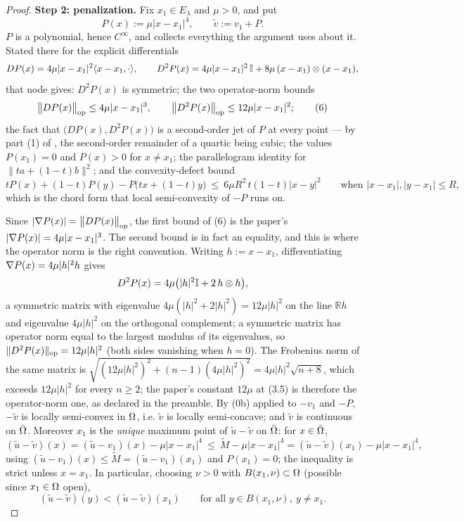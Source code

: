\begin{proof}
\medskip\noindent\textbf{Step 2: penalization.} Fix $x_1\in E_\lambda$ and $\mu>0$, and
put
\[
 P(x):=\mu|x-x_1|^{4},\qquad \tilde v:=v_1+P .
\]
$P$ is a polynomial, hence $C^{\infty}$, and  collects
everything the argument uses about it. Stated there for the explicit differentials
\[
 DP(x)=4\mu|x-x_1|^{2}\langle x-x_1,\cdot\rangle,\qquad
 D^{2}P(x)=4\mu|x-x_1|^{2}\,\mathbb{I}+8\mu\,(x-x_1)\otimes(x-x_1),
\]
that node gives: $D^{2}P(x)$ is symmetric; the two operator-norm bounds
\[
 \big\|DP(x)\big\|_{\rm op}\le4\mu|x-x_1|^{3},\qquad
 \big\|D^{2}P(x)\big\|_{\rm op}\le12\mu|x-x_1|^{2} ; \tag{6}
\]
the fact that $\big(DP(x),D^{2}P(x)\big)$ is a second-order jet of $P$ at every point ---
by part (1) of , the second-order remainder of a quartic
being cubic; the values $P(x_1)=0$ and $P(x)>0$ for $x\ne x_1$; the parallelogram identity
for $\|t a+(1-t)b\|^{2}$; and the convexity-defect bound
\[
 t P(x)+(1-t)P(y)-P\big(t x+(1-t)y\big)\ \le\ 6\mu R^{2}\,t(1-t)|x-y|^{2}
 \qquad\text{when }|x-x_1|,|y-x_1|\le R ,
\]
which is the chord form that local semi-convexity of $-P$ runs on.

Since $|\nabla P(x)|=\big\|DP(x)\big\|_{\rm op}$, the first bound of (6) is the paper's
$|\nabla P(x)|=4\mu|x-x_1|^{3}$. The second bound is in fact an equality, and this is where
the operator norm is the right convention. Writing $h:=x-x_1$, differentiating
$\nabla P(x)=4\mu|h|^{2}h$ gives
\[
 D^{2}P(x)=4\mu\big(|h|^{2}\mathbb{I}+2\,h\otimes h\big),
\]
a symmetric matrix with eigenvalue $4\mu(|h|^{2}+2|h|^{2})=12\mu|h|^{2}$ on the line
$\mathbb Rh$ and eigenvalue $4\mu|h|^{2}$ on the orthogonal complement; a symmetric matrix
has operator norm equal to the largest modulus of its eigenvalues, so
$\|D^{2}P(x)\|_{\rm op}=12\mu|h|^{2}$ (both sides vanishing when $h=0$). The Frobenius norm
of the same matrix is $\sqrt{(12\mu|h|^{2})^{2}+(n-1)(4\mu|h|^{2})^{2}}
=4\mu|h|^{2}\sqrt{n+8}$, which exceeds $12\mu|h|^{2}$ for every $n\ge2$; the paper's
constant $12\mu$ at (3.5) is therefore the operator-norm one, as declared in the
preamble.
By (0b) applied to $-v_1$ and $-P$, $-\tilde v$ is locally semi-convex in $\Omega$, i.e.
$\tilde v$ is locally semi-concave; and $\tilde v$ is continuous on $\bar{\Omega}$. Moreover
$x_1$ is the \emph{unique} maximum point of $\tilde u-\tilde v$ on $\bar{\Omega}$: for
$x\in\bar{\Omega}$,
\[
 (\tilde u-\tilde v)(x)=(\tilde u-v_1)(x)-\mu|x-x_1|^{4}
 \ \le\ \tilde M-\mu|x-x_1|^{4}=(\tilde u-\tilde v)(x_1)-\mu|x-x_1|^{4},
\]
using $(\tilde u-v_1)(x)\le\tilde M=(\tilde u-v_1)(x_1)$ and $P(x_1)=0$; the inequality is
strict unless $x=x_1$. In particular, choosing $\nu>0$ with $B(x_1,\nu)\subset\Omega$
(possible since $x_1\in\Omega$ open),
\[
 (\tilde u-\tilde v)(y)<(\tilde u-\tilde v)(x_1)\qquad\text{for all }y\in B(x_1,\nu),\ y\ne x_1 .
 \tag{7}
\]


\end{proof}

